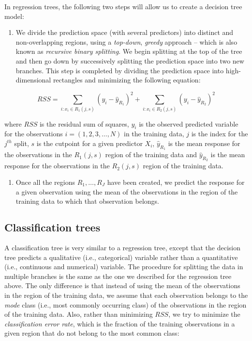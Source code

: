 \documentclass[]{book}
\providecommand{\tightlist}{%
  \setlength{\itemsep}{0pt}\setlength{\parskip}{0pt}}
\begin{document}
In regression trees, the following two steps will allow us to create a decision tree model:

\begin{enumerate}
\def\labelenumi{\arabic{enumi}.}
\tightlist
\item
  We divide the prediction space (with several predictors) into distinct and non-overlapping regions, using a \emph{top-down}, \emph{greedy} approach -- which is also known as \emph{recursive binary splitting}. We begin splitting at the top of the tree and then go down by successively splitting the prediction space into two new branches. This step is completed by dividing the prediction space into high-dimensional rectangles and minimizing the following equation:
\end{enumerate}

\[
RSS=\sum_{i: x_i \in R_1(j,s)}(y_i-\hat{y}_{R_1})^2 + \sum_{i: x_i \in R_2(j,s)}(y_i-\hat{y}_{R_2})^2
\]

where \(RSS\) is the residual sum of squares, \(y_i\) is the observed predicted variable for the observations \(i=(1,2,3, \dots, N)\) in the training data, \(j\) is the index for the \(j^{th}\) split, \(s\) is the cutpoint for a given predictor \(X_i\), \(\hat{y}_{R_1}\) is the mean response for the observations in the \(R_1(j,s)\) region of the training data and \(\hat{y}_{R_2}\) is the mean response for the observations in the \(R_2(j,s)\) region of the training data.

\begin{enumerate}
\def\labelenumi{\arabic{enumi}.}
\setcounter{enumi}{1}
\tightlist
\item
  Once all the regions \(R_1, \dots, R_J\) have been created, we predict the response for a given observation using the mean of the observations in the region of the training data to which that observation belongs.
\end{enumerate}

\hypertarget{classification-trees}{%
\subsection{Classification trees}\label{classification-trees}}

A classification tree is very similar to a regression tree, except that the decision tree predicts a qualitative (i.e., categorical) variable rather than a quantitative (i.e., continuous and numerical) variable. The procedure for splitting the data in multiple branches is the same as the one we described for the regression tree above. The only difference is that instead of using the mean of the observations in the region of the training data, we assume that each observation belongs to the \emph{mode} class (i.e., most commonly occurring class) of the observations in the region of the training data. Also, rather than minimizing \(RSS\), we try to minimize the \emph{classification error rate}, which is the fraction of the training observations in a given region that do not belong to the most common class:
\end{document}

